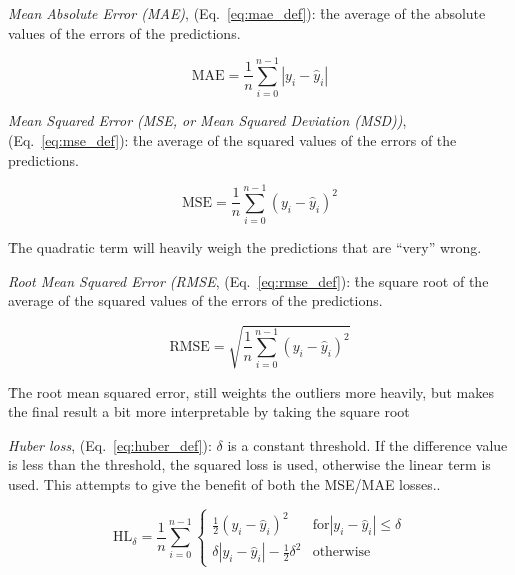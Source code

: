 


\textit{Mean Absolute Error (MAE)}, (Eq.~\ref{eq:mae_def}): \r{the average of the absolute values of the errors of the predictions}.


\begin{equation}
{\textrm{MAE} = \frac{1}{n}\sum_{i=0}^{n-1}|y_i - \hat{y}_i| }
\label{eq:mae_def}
\end{equation}


\textit{Mean Squared Error (MSE, or Mean Squared Deviation (MSD))}, (Eq.~\ref{eq:mse_def}): \r{the average of the squared values of the errors of the predictions}.
	
\begin{equation}
{\textrm{MSE} = \frac{1}{n}\sum_{i=0}^{n-1}(y_i - \hat{y}_i)^2}
\label{eq:mse_def}
\end{equation}

\r{The quadratic term will heavily weigh the predictions that are ``very'' wrong. }


\textit{Root Mean Squared Error (RMSE}, (Eq.~\ref{eq:rmse_def}): \r{the square root of the average of the squared values of the errors of the predictions}.

\begin{equation}
	{\textrm{RMSE} = \sqrt{\frac{1}{n}\sum_{i=0}^{n-1}(y_i - \hat{y}_i)^2}}
	\label{eq:rmse_def}
\end{equation}

\r{The root mean squared error, still weights the outliers more heavily, but makes the final result a bit more interpretable by taking the square root}


\textit{Huber loss}, (Eq.~\ref{eq:huber_def}): \r{$\delta$ is a constant threshold. If the difference value is less than the threshold, the squared loss is used, otherwise the linear term is used. This attempts to give the benefit of both the MSE/MAE losses.}.

\begin{equation}
	{\textrm{HL}_\delta = \frac{1}{n}\sum_{i=0}^{n-1} 
		\begin{cases} 
			\frac{1}{2}(y_i - \hat{y}_i)^2 & \textrm{for}|y_i - \hat{y}_i| \le \delta \\
			\delta |y_i - \hat{y}_i| -  \frac{1}{2} \delta^2 & \textrm{otherwise} 
	\end{cases}}
	\label{eq:huber_def}
\end{equation}


